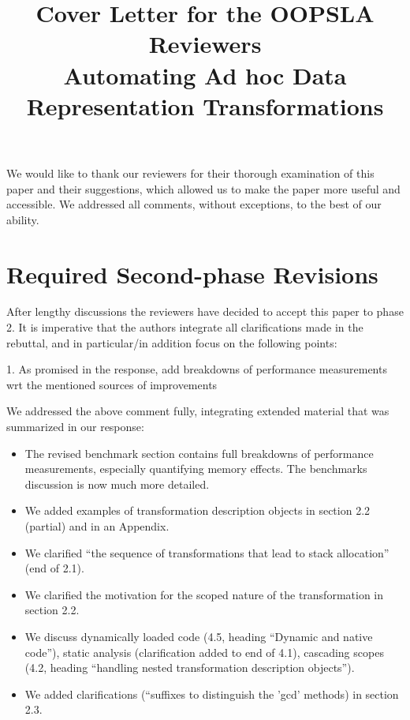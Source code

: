 \documentclass[9pt]{article}
\newenvironment{editorial}
{ \color{Red} \framebox{{\bf REVISION}} }
{  }
\newenvironment{answer}
{ \em \framebox{{\bf AUTHOR RESPONSE}} }
{  }
\begin{document}
\title{Cover Letter for the OOPSLA Reviewers\\\Large Automating Ad hoc Data Representation Transformations}
\maketitle

We would like to thank our reviewers for their thorough examination of this paper and their suggestions, which allowed us to make the paper more useful and accessible. We addressed all comments, without exceptions, to the best of our ability.


\section{Required Second-phase Revisions}


\begin{editorial}
After lengthy discussions the reviewers have decided to accept this paper to phase 2. It is imperative that the authors integrate all clarifications made in the rebuttal, and in particular/in addition focus on the following points:

1. As promised in the response, add breakdowns of performance measurements wrt the mentioned sources of improvements
\end{editorial}

\begin{answer}

We addressed the above comment fully, integrating extended material that was summarized in our
response:

\begin{itemize}
\item The revised benchmark section contains full breakdowns of performance measurements, especially
quantifying memory effects. The benchmarks discussion is now much more detailed.

\item We added examples of transformation description objects in section 2.2 (partial) and in an Appendix.
\item We clarified ``the sequence of transformations that lead to stack allocation'' (end of 2.1).
\item We clarified the motivation for the scoped nature of the transformation in section 2.2.
\item We discuss dynamically loaded code (4.5, heading ``Dynamic and native code''), static analysis
  (clarification added to end of 4.1), cascading scopes (4.2, heading ``handling nested transformation description objects'').
\item We added clarifications (``suffixes to distinguish the 'gcd' methods) in section 2.3.
\end{itemize}

\end{answer}
\end{document}
